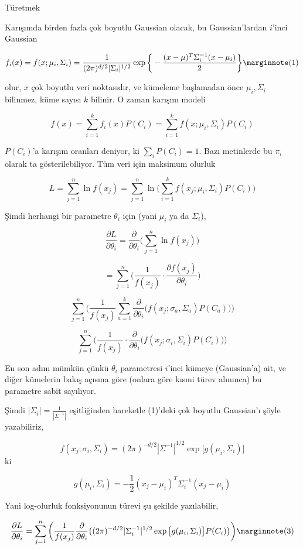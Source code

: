 \documentclass[12pt,fleqn]{article}\usepackage{../../common}
\begin{document}
Türetmek 

Karışımda birden fazla çok boyutlu Gaussian olacak, bu Gaussian'lardan
$i$'inci Gaussian

$$ 
f_i(x) = f(x;\mu_i,\Sigma_i) = 
\frac{1}{(2\pi)^{d/2} |\Sigma_i|^{1/2}} \exp 
\bigg\{
-\frac{(x-\mu)^T\Sigma_i^{-1}(x-\mu_i)}{2} 
\bigg\} 
\mlabel{1}
$$

olur, $x$ çok boyutlu veri noktasıdır, ve kümeleme başlamadan önce
$\mu_i,\Sigma_i$ bilinmez, küme sayısı $k$ bilinir. O zaman karışım modeli

$$ f(x) = \sum _{i=1}^{k} f_i(x)P(C_i) =
\sum _{i=1}^{k} f(x;\mu_i,\Sigma_i)P(C_i)
$$

$P(C_i)$'a karışım oranları deniyor, ki $\sum_i P(C_i) = 1$. Bazı
metinlerde bu $\pi_i$ olarak ta gösterilebiliyor.  Tüm veri için maksimum
olurluk

$$ 
L = \sum _{j=1}^{n} \ln f(x_j) = \sum _{j=1}^{n} \ln \bigg(
\sum _{i=1}^{k} f(x_j;\mu_i,\Sigma_i)P(C_i)
\bigg)
$$

Şimdi herhangi bir parametre $\theta_i$ için (yani $\mu_i$ ya da $\Sigma_i$), 

$$ 
\frac{\partial L}{\partial \theta_i} = 
\frac{\partial }{\partial \theta_i} 
\bigg(\sum _{j=1}^{n} \ln f(x_j) \bigg)
$$

$$ 
= 
\sum _{j=1}^{n} \big( \frac{1}{f(x_j)} \cdot
\frac{\partial f(x_j)}{\partial \theta_i} \big)
$$

$$ 
\sum _{j=1}^{n} \bigg(
\frac{1}{f(x_j)} \sum _{a=1}^{k} \frac{\partial }{\partial \theta_i}
\big( f(x_j;\sigma_a,\Sigma_a)P(C_a) \big)
\bigg)
$$

$$ 
\sum _{j=1}^{n} \bigg(
\frac{1}{f(x_j)} \cdot \frac{\partial }{\partial \theta_i}
\big( f(x_j;\sigma_i,\Sigma_i)P(C_i) \big)
\bigg)
$$

En son adım mümkün çünkü $\theta_i$ parametresi $i$'inci kümeye
(Gaussian'a) ait, ve diğer kümelerin bakış açısına göre (onlara göre kısmi
türev alınınca) bu parametre sabit sayılıyor. 

Şimdi $|\Sigma_i| = \frac{1}{|\Sigma^{-1}|}$ eşitliğinden hareketle
(1)'deki çok boyutlu Gaussian'ı şöyle yazabiliriz, 

$$ 
f(x_j;\sigma_i,\Sigma_i) = (2\pi)^{-d/2} |\Sigma^{-1}|^{1/2} 
\exp \big[ g(\mu_i,\Sigma_i) \big]
$$ 
ki

$$ g(\mu_i,\Sigma_i) = -\frac{1}{2}(x_j-\mu_i)^T\Sigma_i^{-1}(x_j-\mu_i) $$

Yani log-olurluk fonksiyonunun türevi şu şekilde yazılabilir,

$$ 
\frac{\partial L}{\partial \theta_i} =
\sum _{j=1}^{n} \bigg(
\frac{1}{f(x_j)} \frac{\partial }{\partial \theta_i} \big(
(2\pi)^{-d/2} |\Sigma_i^{-1}|^{1/2} \exp\big[ 
g(\mu_i,\Sigma_i) \big] P(C_i)
\big) \bigg)
\mlabel{3}
$$
\end{document}
